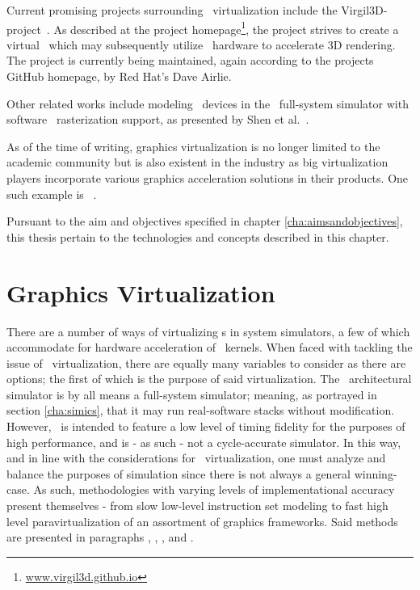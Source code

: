 Current promising projects surrounding \dvttermgpu\ virtualization include the Virgil3D-project~.
As described at the project homepage\footnote{\href{http://virgil3d.github.io/}{www.virgil3d.github.io}}, the project strives to create a virtual \dvttermgpu\ which may subsequently utilize \dvttermhost\ hardware to accelerate 3D rendering.
The project is currently being maintained, again according to the projects GitHub homepage, by Red Hat's Dave Airlie.

Other related works include modeling \dvttermgpu\ devices in the \dvttermqemu\ full-system simulator with software \dvttermopengles\ rasterization support, as presented by Shen et al.~.

As of the time of writing, graphics virtualization is no longer limited to the academic community but is also existent in the industry as big virtualization players incorporate various graphics acceleration solutions in their products.
One such example is \dvttermvmware ~.

Pursuant to the aim and objectives specified in chapter \ref{cha:aimsandobjectives}, this thesis pertain to the technologies and concepts described in this chapter.


\section{Graphics Virtualization}
\label{sec:backgroundandrelatedwork_graphicsvirtualization}
There are a number of ways of virtualizing \dvttermgpu s in system simulators, a few of which accommodate for hardware acceleration of \dvttermgpu\ kernels.
When faced with tackling the issue of \dvttermgpu\ virtualization, there are equally many variables to consider as there are options; the first of which is the purpose of said virtualization.
The \dvttermsimics\ architectural simulator is by all means a full-system simulator; meaning, as portrayed in section \ref{cha:simics}, that it may run real-software stacks without modification.
However, \dvttermsimics\ is intended to feature a low level of timing fidelity for the purposes of high performance, and is - as such - not a cycle-accurate simulator.
In this way, and in line with the considerations for \dvttermgpu\ virtualization, one must analyze and balance the purposes of simulation since there is not always a general winning-case.
As such, methodologies with varying levels of implementational accuracy present themselves - from slow low-level instruction set modeling to fast high level paravirtualization of an assortment of graphics frameworks.
Said methods are presented in paragraphs , , , and .

